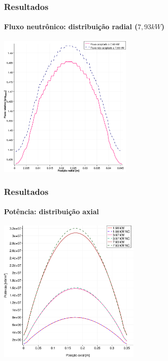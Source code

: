 \documentclass[svgnames,smaller,table]{beamer}
\begin{document}
\begin{frame}
  \frametitle{Resultados}
  \framesubtitle{Fluxo neutrônico: distribuição radial ($7,93 kW$)}
  \centering\includegraphics[width=\textwidth, height=7.0cm]{../figuras/Flux_rel_x_200_port.png}
  \label{fig:flux200x}
\end{frame}

\begin{frame}
  \frametitle{Resultados}
  \framesubtitle{Potência: distribuição axial}
  \centering\includegraphics[width=\textwidth, height=7.0cm]{../figuras/Q_all_z_square_port.png}
  \label{fig:keff50}
\end{frame}
\end{document}
